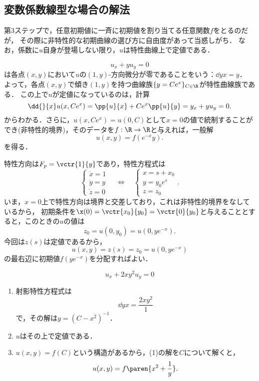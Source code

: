\documentclass[uplatex,dvipdfmx]{jsreport}
\begin{document}
\subsection{変数係数線型な場合の解法}

\begin{tcolorbox}[colframe=ForestGreen, colback=ForestGreen!10!white,breakable,colbacktitle=ForestGreen!40!white,coltitle=black,fonttitle=\bfseries\sffamily,
title=]
    第3ステップで，任意初期値に一斉に初期値を割り当てる任意関数$f$をとるのだが，
    その際に非特性的な初期曲線の選び方に自由度があって当惑しがち．
    なお，係数に$u$自身が登場しない限り，$u$は特性曲線上で定値である．
\end{tcolorbox}

\begin{example}
    \[u_x+yu_y=0\]
    は各点$(x,y)$において$u$の$(1,y)$-方向微分が零であることをいう：$\dd{y}{x}=y$．
    よって，各点$(x,y)$で傾き$(1,y)$を持つ曲線族$\{y=Ce^{x}\}_{C\in\R}$が特性曲線族である．
    この上で$u$が定値になっているのは，計算
    \[\dd{}{x}u(x,Ce^x)=\pp{u}{x}+Ce^x\pp{u}{y}=y_x+yu_y=0.\]
    からわかる．さらに，$u(x,Ce^x)=u(0,C)$として$x=0$の値で統制することができ(非特性的境界)，そのデータを$f:\R\to\R$と与えれば，一般解
    \[u(x,y)=f(e^{-x}y).\]
    を得る．
\end{example}
\begin{Proof}
    特性方向は$F_p=\vctr{1}{y}$であり，特性方程式は
    \[\begin{cases}
        \dot{x}=1\\
        \dot{y}=y\\
        \dot{z}=0
    \end{cases}\quad\Leftrightarrow\quad\begin{cases}
        x=s+x_0\\
        y=y_0e^s\\
        z=z_0
    \end{cases}.\]
    いま，$x=0$上で特性方向は境界と交差しており，これは非特性的境界をなしているから，
    初期条件を$\x(0)=\vctr{x_0}{y_0}=\vctr{0}{y_0}$と与えることとすると，このときの$u$の値は
    \[z_0=u(0,y_0)=u(0,ye^{-x}).\]
    今回は$z(s)$は定値であるから，
    \[u(x,y)=z(s)=z_0=u(0,ye^{-x})\]
    の最右辺に初期値$f(ye^{-x})$を分配すればよい．
\end{Proof}

\begin{example}
    \[u_x+2xy^2u_y=0\]
    \begin{enumerate}
        \item 射影特性方程式は
        \[\dd{y}{x}=\frac{2xy^2}{1}\]
        で，その解は$y=(C-x^2)^{-1}$．
        \item $u$はその上で定値である．
        \item $u(x,y)=f(C)$という構造があるから，(1)の解を$C$について解くと，
        \[u(x,y)=f\paren{x^2+\frac{1}{y}}.\]
    \end{enumerate}
\end{example}
\end{document}
